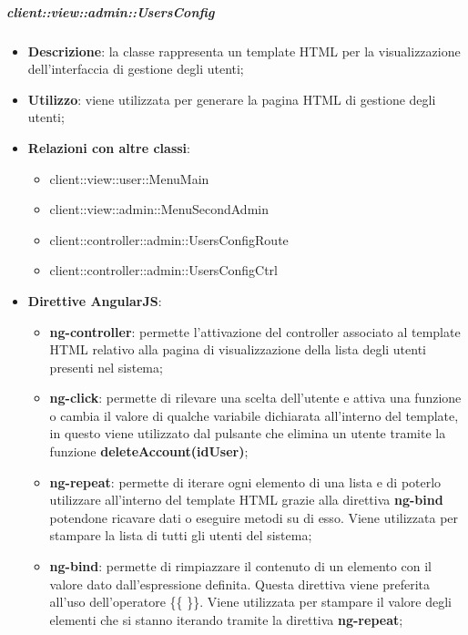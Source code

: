 		\subparagraph{client::view::admin::UsersConfig} %
		\label{subp:bdsm_app_client_view_admin_usersconfig}

			\begin{itemize}
				\item \textbf{Descrizione}: la classe rappresenta un template HTML per la visualizzazione dell'interfaccia di gestione degli utenti;
				\item \textbf{Utilizzo}: viene utilizzata per generare la pagina HTML di gestione degli utenti;
				\item \textbf{Relazioni con altre classi}:
					\begin{itemize}
						\item client::view::user::MenuMain
						\item client::view::admin::MenuSecondAdmin
						\item client::controller::admin::UsersConfigRoute
						\item client::controller::admin::UsersConfigCtrl
					\end{itemize}
				\item \textbf{Direttive AngularJS}:
					\begin{itemize}
						\item \textbf{ng-controller}: permette l'attivazione del controller associato al template HTML relativo alla pagina di visualizzazione della lista degli utenti presenti nel sistema;
						\item \textbf{ng-click}: permette di rilevare una scelta dell'utente e attiva una funzione o cambia il valore di qualche variabile dichiarata all'interno del template, in questo viene utilizzato dal pulsante che elimina un utente tramite la funzione \textbf{deleteAccount(idUser)};
						\item \textbf{ng-repeat}: permette di iterare ogni elemento di una lista e di poterlo utilizzare all'interno del template HTML grazie alla direttiva \textbf{ng-bind} potendone ricavare dati o eseguire metodi su di esso. Viene utilizzata per stampare la lista di tutti gli utenti del sistema;
						\item \textbf{ng-bind}: permette di rimpiazzare il contenuto di un elemento con il valore dato dall'espressione definita. Questa direttiva viene preferita all'uso dell'operatore \{\{ \}\}. Viene utilizzata per stampare il valore degli elementi che si stanno iterando tramite la direttiva \textbf{ng-repeat};
					\end{itemize}
			\end{itemize}

